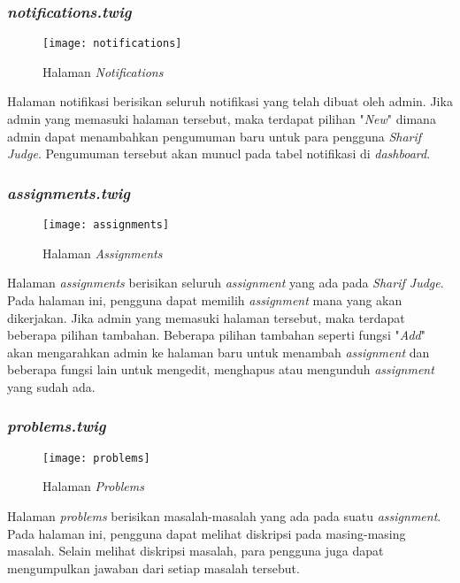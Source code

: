 \subsubsection{\textit{notifications.twig}}
\begin{figure}[H]
	\centering  
	\texttt{[image: notifications]}  
	\caption[Halaman \textit{Notifications}]{Halaman \textit{Notifications}} 
	\label{fig:notifications} 
\end{figure} 
Halaman notifikasi berisikan seluruh notifikasi yang telah dibuat oleh admin. Jika admin yang memasuki halaman tersebut, maka terdapat pilihan "\textit{New}" dimana admin dapat menambahkan pengumuman baru untuk para pengguna \textit{Sharif Judge}. Pengumuman tersebut akan munucl pada tabel notifikasi di \textit{dashboard}.

\subsubsection{\textit{assignments.twig}}
\begin{figure}[H]
	\centering  
	\texttt{[image: assignments]}  
	\caption[Halaman \textit{Assignments}]{Halaman \textit{Assignments}} 
	\label{fig:assignments} 
\end{figure} 
Halaman \textit{assignments} berisikan seluruh \textit{assignment} yang ada pada \textit{Sharif Judge}. Pada halaman ini, pengguna dapat memilih \textit{assignment} mana yang akan dikerjakan. Jika admin yang memasuki halaman tersebut, maka terdapat beberapa pilihan tambahan. Beberapa pilihan tambahan seperti fungsi "\textit{Add}" akan mengarahkan admin ke halaman baru untuk menambah \textit{assignment} dan beberapa fungsi lain untuk mengedit, menghapus atau mengunduh \textit{assignment} yang sudah ada.

\subsubsection{\textit{problems.twig}}
\begin{figure}[H]
	\centering  
	\texttt{[image: problems]}  
	\caption[Halaman \textit{Problems}]{Halaman \textit{Problems}} 
	\label{fig:problems} 
\end{figure} 
Halaman \textit{problems} berisikan masalah-masalah yang ada pada suatu \textit{assignment}. Pada halaman ini, pengguna dapat melihat diskripsi pada masing-masing masalah. Selain melihat diskripsi masalah, para pengguna juga dapat mengumpulkan jawaban dari setiap masalah tersebut.

